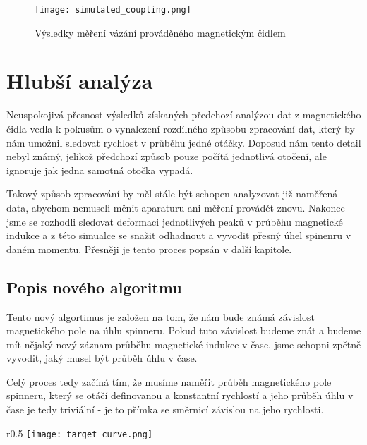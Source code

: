 \begin{figure}[!ht]
    \texttt{[image: simulated\_coupling.png]}
    \centering
    \caption{Výsledky měření vázání prováděného magnetickým čidlem}
    \label{fig:mag_coupling_vernier}
\end{figure}

\section{Hlubší analýza}

Neuspokojivá přesnost výsledků získaných předchozí analýzou dat z magnetického čidla vedla k pokusům o vynalezení rozdílného způsobu zpracování dat, který by nám umožnil sledovat rychlost v průběhu jedné otáčky. Doposud nám tento detail nebyl známý, jelikož předchozí způsob pouze počítá jednotlivá otočení, ale ignoruje jak jedna samotná otočka vypadá.

Takový způsob zpracování by měl stále být schopen analyzovat již naměřená data, abychom nemuseli měnit aparaturu ani měření provádět znovu. Nakonec jsme se rozhodli sledovat deformaci jednotlivých peaků v průběhu magnetické indukce a z této simualce se snažit odhadnout a vyvodit přesný úhel spinenru v daném momentu. Přesněji je tento proces popsán v další kapitole.

\clearpage
\subsection{Popis nového algoritmu}

Tento nový algortimus je založen na tom, že nám bude známá závislost magnetického pole na úhlu spinneru. Pokud tuto závislost budeme znát a budeme mít nějaký nový záznam průběhu magnetické indukce v čase, jsme schopni zpětně vyvodit, jaký musel být průběh úhlu v čase.

Celý proces tedy začíná tím, že musíme naměřit průběh magnetického pole spinneru, který se otáčí definovanou a konstantní rychlostí a jeho průběh úhlu v čase je tedy triviální - je to přímka se směrnicí závislou na jeho rychlosti.

\begin{wrapfigure}{r}{0.5\textwidth}
    \texttt{[image: target\_curve.png]}
    \centering
    \caption{}
    \label{fig:target_curve}
\end{wrapfigure}

